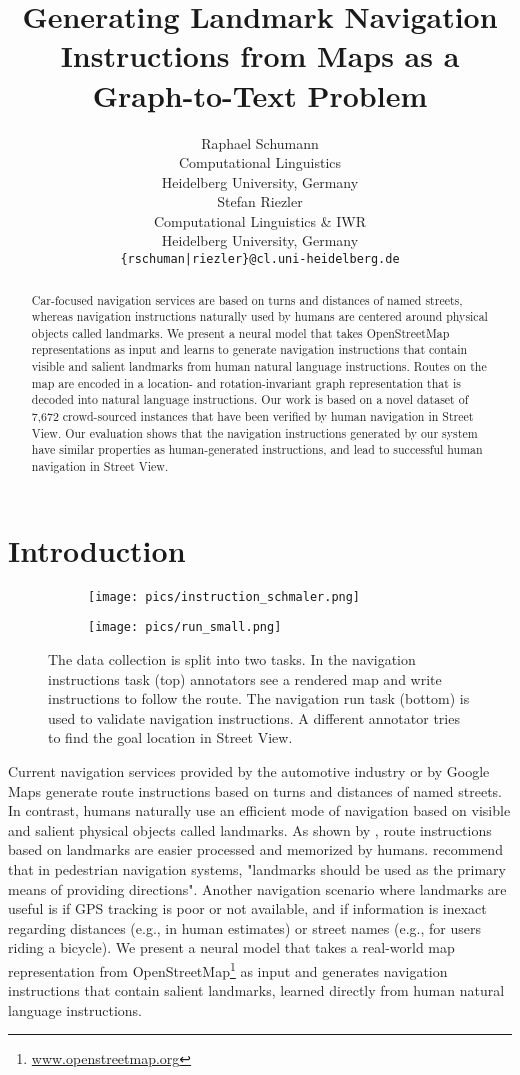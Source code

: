 \documentclass[11pt,a4paper]{article}
\title{Generating Landmark Navigation Instructions from Maps as a Graph-to-Text Problem}
\author{Raphael Schumann \\
  Computational Linguistics\\
  Heidelberg University, Germany \\
  \And
  Stefan Riezler \\
  Computational Linguistics \& IWR \\
  Heidelberg University, Germany \\
  \hspace{-7cm}\texttt{\{rschuman|riezler\}@cl.uni-heidelberg.de}}
\date{}
\begin{document}
\maketitle
\begin{abstract}
Car-focused navigation services are based on turns and distances of named streets, whereas navigation instructions naturally used by humans are centered around physical objects called landmarks. We present a neural model that takes OpenStreetMap representations as input and learns to generate navigation instructions that contain visible and salient landmarks from human natural language instructions. Routes on the map are encoded in a location- and rotation-invariant graph representation that is decoded into natural language instructions. Our work is based on a novel dataset of 7,672 crowd-sourced instances that have been verified by human navigation in Street View. Our evaluation shows that the navigation instructions generated by our system have similar properties as human-generated instructions, and lead to successful human navigation in Street View.
\end{abstract}

\section{Introduction}
\begin{figure*}
  \centering
  \begin{subfigure}{0.99\textwidth}
  \texttt{[image: pics/instruction\_schmaler.png]}
  \vspace{0.01cm}
  \end{subfigure}
  \begin{subfigure}{0.99\textwidth}
  \texttt{[image: pics/run\_small.png]}
  \end{subfigure}
  \caption{The data collection is split into two tasks. In the navigation instructions task (top) annotators see a rendered map and write instructions to follow the route. The navigation run task (bottom) is used to validate navigation instructions. A different annotator tries to find the goal location in Street View.}
  \label{fig:instructions_task}
\end{figure*}
Current navigation services provided by the automotive industry or by Google Maps generate route instructions based on turns and distances of named streets. In contrast, humans naturally use an efficient mode of navigation based on visible and salient physical objects called landmarks. As shown by \citet{tom_and_denis_2004}, route instructions based on landmarks are easier processed and memorized by humans. \citet{May2003} recommend that in pedestrian navigation systems, "landmarks should be used as the primary means of providing directions". Another navigation scenario where landmarks are useful is if GPS tracking is poor or not available, and if information is inexact regarding distances (e.g., in human estimates) or street names (e.g., for users riding a bicycle). We present a neural model that takes a real-world map representation from OpenStreetMap\footnote{\url{www.openstreetmap.org}} as input and generates navigation instructions that contain salient landmarks, learned directly from human natural language instructions.
\end{document}
